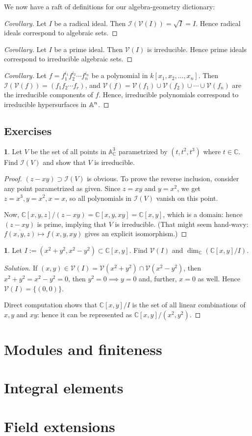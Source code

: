 \documentclass{book}
\newcommand{\I}[1]{\mathcal{I}(#1)}
\newcommand{\V}[1]{\mathcal{V}(#1)}
\newcommand{\kn}{k[x_1,x_2,\ldots,x_n]}
\newcommand{\Af}{{\Bbb A}^n}
\newcommand{\C}{\mathbb C}
\theoremstyle{definition}
\theoremstyle{block}
\newtheorem{block*}[block]{}
\theoremstyle{thm}
\begin{document}
We now have a raft of definitions for our algebra-geometry
dictionary:
\begin{proof}[Corollary]
  Let $I$ be a radical ideal. Then $\I{\V I} = \sqrt I = I$. Hence radical
  ideals correspond to algebraic sets.
\end{proof}
\begin{proof}[Corollary]
  Let $I$ be a prime ideal. Then $\V I$ is irreducible. Hence prime ideals
  correspond to irreducible algebraic sets.
\end{proof}
\begin{proof}[Corollary]
  Let $f=f_1^{i_1}f_2^{i_2}\cdots f_n^{i_n}$ be a polynomial in $\kn$. Then
  $\I{\V f} = (f_1f_2\cdots f_r)$, and $\V f =
  \V{f_1}\cup\V{f_2}\cup\cdots\cup\V{f_n}$ are the irreducible components of
  $f$. Hence, irreducible polynomials correspond to irreducible hypersurfaces in
  $\Af$.
\end{proof}

\subsection{Exercises}
\begin{block*}
  Let $V$ be the set of all points in $\mathbb{A}^3_{\mathbb C}$ parametrized by
  $(t,t^2,t^3)$ where $t\in\mathbb C$. Find $\I V$ and show that $V$ is irreducible.
\end{block*}
\begin{proof}
  $(z-xy)\supset \I V$ is obvious. To prove the reverse inclusion, consider any
  point parametrized as given. Since $z=xy$ and $y=x^2$, we get
  $z=x^3,y=x^2,x=x$, so all polynomials in $\I V$ vanish on this point.\par
  Now, ${\mathbb C}[x,y,z]/(z-xy) = {\mathbb C}[x,y,xy] = {\mathbb C}[x,y]$,
  which is a domain: hence $(z-xy)$ is prime, implying that $V$ is irreducible. 
  (That might seem hand-wavy: $\overline{f(x,y,z)}\mapsto f(x,y,xy)$ gives an
  explicit isomorphism.)
\end{proof}

\begin{block*}
  Let $I:=(x^2+y^2,x^2-y^2)\subset\C[x,y]$. Find $\V I$ and $\dim_{\C}(\C[x,y]/I)$.
\end{block*}
\begin{proof}[Solution]
  If $(x,y)\in\V I=\V{x^2+y^2}\cap\V{x^2-y^2}$, then $x^2+y^2=x^2-y^2=0$, then
  $y^2=0\implies y=0$ and, further, $x=0$ as well. Hence $\V I = \{(0,0)\}$.\par 
  Direct computation shows that $\C[x,y]/I$ is the set of all linear
  combinations of $x,y$ and $xy$: hence it can be represented as
  $\C[x,y]/(x^2,y^2)$. 
\end{proof}

\section{Modules and finiteness}

\section{Integral elements}

\section{Field extensions}
\end{document}
